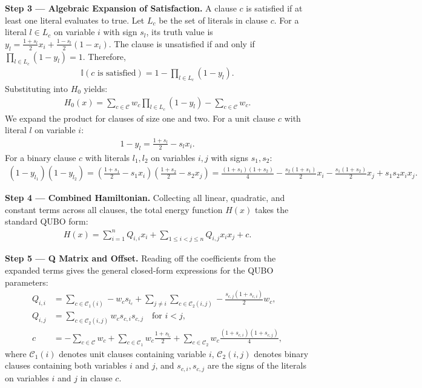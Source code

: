 \documentclass[12pt]{article}
\begin{document}
\textbf{Step 3 --- Algebraic Expansion of Satisfaction.} A clause $c$ is satisfied if at least one literal evaluates to true. Let $L_c$ be the set of literals in clause $c$. For a literal $l \in L_c$ on variable $i$ with sign $s_l$, its truth value is $y_l = \frac{1+s_l}{2}x_i + \frac{1-s_l}{2}(1-x_i)$. The clause is unsatisfied if and only if $\prod_{l \in L_c} (1-y_l) = 1$. Therefore,
\begin{align}
    \mathbb{I}(c \text{ is satisfied}) = 1 - \prod_{l \in L_c} (1-y_l).
\end{align}
Substituting into $H_0$ yields:
\begin{align}
    H_0(x) = \sum_{c \in \mathcal{C}} w_c \prod_{l \in L_c} (1-y_l) - \sum_{c \in \mathcal{C}} w_c.
\end{align}
We expand the product for clauses of size one and two. For a unit clause $c$ with literal $l$ on variable $i$:
\begin{align}
    1-y_l = \frac{1+s_l}{2} - s_l x_i.
\end{align}
For a binary clause $c$ with literals $l_1, l_2$ on variables $i, j$ with signs $s_1, s_2$:
\begin{align}
    (1-y_{l_1})(1-y_{l_2}) = \left(\frac{1+s_1}{2} - s_1 x_i\right)\left(\frac{1+s_2}{2} - s_2 x_j\right) = \frac{(1+s_1)(1+s_2)}{4} - \frac{s_2(1+s_1)}{2}x_i - \frac{s_1(1+s_2)}{2}x_j + s_1 s_2 x_i x_j.
\end{align}

\textbf{Step 4 --- Combined Hamiltonian.} Collecting all linear, quadratic, and constant terms across all clauses, the total energy function $H(x)$ takes the standard QUBO form:
\begin{align}
    H(x) = \sum_{i=1}^n Q_{i,i} x_i + \sum_{1 \le i < j \le n} Q_{i,j} x_i x_j + c.
\end{align}

\textbf{Step 5 --- Q Matrix and Offset.} Reading off the coefficients from the expanded terms gives the general closed-form expressions for the QUBO parameters:
\begin{align}
    Q_{i,i} &= \sum_{c \in \mathcal{C}_1(i)} -w_c s_{l_c} + \sum_{j \neq i} \sum_{c \in \mathcal{C}_2(i,j)} -\frac{s_{c,j}(1+s_{c,i})}{2} w_c, \\
    Q_{i,j} &= \sum_{c \in \mathcal{C}_2(i,j)} w_c s_{c,i} s_{c,j} \quad \text{for } i < j, \\
    c &= -\sum_{c \in \mathcal{C}} w_c + \sum_{c \in \mathcal{C}_1} w_c \frac{1+s_{l_c}}{2} + \sum_{c \in \mathcal{C}_2} w_c \frac{(1+s_{c,i})(1+s_{c,j})}{4},
\end{align}
where $\mathcal{C}_1(i)$ denotes unit clauses containing variable $i$, $\mathcal{C}_2(i,j)$ denotes binary clauses containing both variables $i$ and $j$, and $s_{c,i}, s_{c,j}$ are the signs of the literals on variables $i$ and $j$ in clause $c$.
\end{document}
